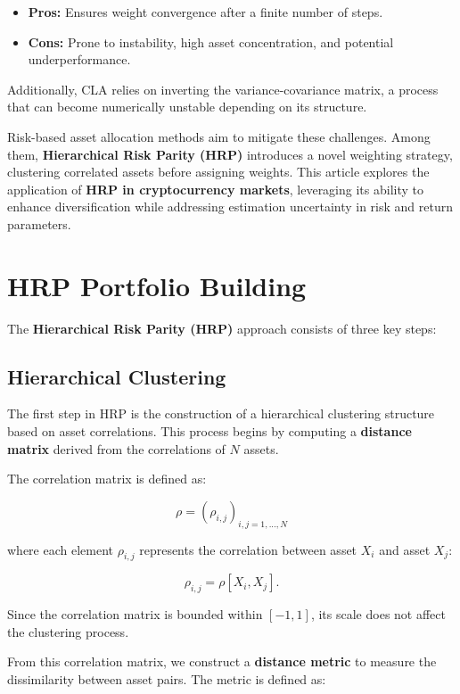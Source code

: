 \documentclass[english]{maciarticle}
\begin{document}
\begin{itemize}
    \item \textbf{Pros:} Ensures weight convergence after a finite number of steps.
    \item \textbf{Cons:} Prone to instability, high asset concentration, and potential underperformance.
\end{itemize}

Additionally, CLA relies on inverting the variance-covariance matrix, a process that can become numerically unstable depending on its structure.

Risk-based asset allocation methods aim to mitigate these challenges. Among them, \textbf{Hierarchical Risk Parity (HRP)} introduces a novel weighting strategy, clustering correlated assets before assigning weights. This article explores the application of \textbf{HRP in cryptocurrency markets}, leveraging its ability to enhance diversification while addressing estimation uncertainty in risk and return parameters.

\section{HRP Portfolio Building}

The \textbf{Hierarchical Risk Parity (HRP)} approach consists of three key steps:

\subsection{Hierarchical Clustering}
The first step in HRP is the construction of a hierarchical clustering structure based on asset correlations. This process begins by computing a \textbf{distance matrix} derived from the correlations of \(N\) assets.

The correlation matrix is defined as:

\[
\rho = \left( \rho_{i,j} \right)_{i,j=1,...,N}
\]

where each element \(\rho_{i,j}\) represents the correlation between asset \(X_i\) and asset \(X_j\):

\[
\rho_{i,j} = \rho[X_i, X_j].
\]

Since the correlation matrix is bounded within \([-1,1]\), its scale does not affect the clustering process.

From this correlation matrix, we construct a \textbf{distance metric} to measure the dissimilarity between asset pairs. The metric is defined as:
\end{document}

